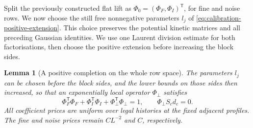 \documentclass[11pt,reqno]{amsart}
\numberwithin{equation}{section}
\newtheorem{lemma}[theorem]{Lemma}
\theoremstyle{definition}
\theoremstyle{remark}
\begin{document}
Split the previously constructed flat lift as
\(\Phi_0=(\Phi_F,\Phi_I)^{\mathsf T}\), for fine and noise rows.
We now choose the still free nonnegative parameters \(l_j\)
of \eqref{eq:calibration-positive-extension}. This choice
preserves the potential kinetic matrices and all preceding
Gaussian identities. We use one Laurent division estimate for
both factorisations, then choose the positive extension before
increasing the block sides.

\begin{lemma}[A positive completion on the whole row space]
\label{lem:packet-complement}
The parameters \(l_j\) can be chosen before the block sides,
and the lower bounds on those sides then increased, so that
an exponentially local operator \(\Phi_\perp\) satisfies
\begin{equation}
 \Phi_F^{\mathsf T}\Phi_F+\Phi_I^{\mathsf T}\Phi_I+\Phi_\perp^{\mathsf T}\Phi_\perp=1,
                       \qquad\Phi_\perp S_cd_c=0.
 \label{eq:packet-row-completion}
\end{equation}
All coefficient prices are uniform over legal histories at the
fixed adjacent profiles. The fine and noise prices remain
\(CL^{-2}\) and \(C\), respectively.
\end{lemma}
\end{document}
